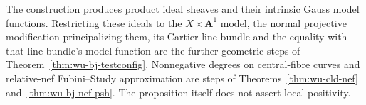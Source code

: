 \begin{remark}
\label{rmk:pl-ideals-remaining-geometry}
The construction produces product ideal sheaves and their intrinsic
Gauss model functions.  Restricting these ideals to the
$X\times\mathbf A^1$ model, the normal projective modification principalizing
them, its Cartier line bundle and the equality with that line
bundle's model function are the further geometric steps of
Theorem~\ref{thm:wu-bj-testconfig}.  Nonnegative degrees on central-fibre curves
and relative-nef Fubini--Study approximation are steps of
Theorems~\ref{thm:wu-cld-nef} and~\ref{thm:wu-bj-nef-psh}.  The proposition itself
does not assert local positivity.
\end{remark}
